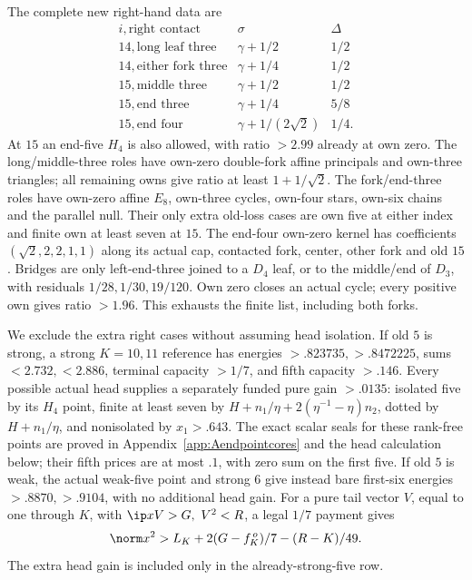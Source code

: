 The complete new right-hand data are
\[
\begin{array}{c|c|c}
i,\text{right contact}&\sigma&\Delta\\ \hline
14,\text{long leaf three}&\gamma+1/2&1/2\\
14,\text{either fork three}&\gamma+1/4&1/2\\
15,\text{middle three}&\gamma+1/2&1/2\\
15,\text{end three}&\gamma+1/4&5/8\\
15,\text{end four}&\gamma+1/(2\sqrt2)&1/4 .
\end{array}
\]
At \(15\) an end-five \(H_4\) is also allowed, with ratio \(>2.99\)
already at own zero.
The long/middle-three roles have own-zero double-fork affine
principals and own-three triangles; all remaining owns give ratio
at least \(1+1/\sqrt2\).
The fork/end-three roles have own-zero affine \(E_8\), own-three
cycles, own-four stars, own-six chains and the parallel null.
Their only extra old-loss cases are own five at either index and
finite own at least seven at \(15\).
The end-four own-zero kernel has coefficients
\((\sqrt2,2,2,1,1)\) along its actual cap, contacted fork,
center, other fork and old \(15\).
Bridges are only left-end-three joined to a \(D_4\) leaf, or
to the middle/end of \(D_3\), with residuals
\(1/28,1/30,19/120\). Own zero closes an actual cycle;
every positive own gives ratio \(>1.96\).
This exhausts the finite list, including both forks.

We exclude the extra right cases without assuming head isolation.
If old \(5\) is strong, a strong \(K=10,11\) reference has
energies \(>.823735,>.8472225\), sums \(<2.732,<2.886\),
terminal capacity \(>1/7\), and fifth capacity \(>.146\).
Every possible actual head supplies a separately funded pure gain
\(>.0135\): isolated five by its \(H_4\) point, finite at least seven
by \(H+n_1/\eta+2(\eta^{-1}-\eta)n_2\), dotted by \(H+n_1/\eta\),
and nonisolated by \(x_1>.643\).
The exact scalar seals for these rank-free points are proved in
Appendix~\ref{app:Aendpointcores} and the head calculation below;
their fifth prices are at most \(.1\), with zero sum on the first five.
If old \(5\) is weak, the actual weak-five point and strong \(6\)
give instead bare first-six energies \(>.8870,>.9104\),
with no additional head gain.
For a pure tail vector \(V\), equal to one through \(K\), with
\(\ip xV>G,\ V^2<R\), a legal \(1/7\) payment gives
\[
 \norm x^2>L_K+2(G-f_K^{\,o})/7-(R-K)/49.
\]
The extra head gain is included only in the already-strong-five row.

